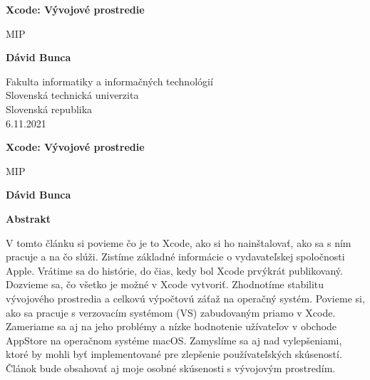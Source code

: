 \documentclass[12pt]{article}
\begin{document}
	\begin{titlepage}
   		 \begin{center}
        
            
      			  \Huge
      			  \textbf{Xcode: Vývojové prostredie}
            
     			   \vspace{0.5cm}
        			  \LARGE
				MIP
        
            
       			 \vspace{1.5cm}
            
       			 \textbf{Dávid Bunca}
            
       			 \vfill
            
            
       			 \vspace{0.8cm}

        			\centering   
            
       			 \Large
       			 Fakulta informatiky a informačných technológií\\
        			Slovenská technická univerzita\\
       			Slovenská republika\\
        			6.11.2021
            
   		 \end{center}
	\end{titlepage}

	\begin{center}
   		 \Large
    		\textbf{Xcode: Vývojové prostredie}
        
   		 \vspace{0.4cm}
    		\large
    		MIP
        
   		 \vspace{0.4cm}
    		\textbf{Dávid Bunca}
       
  		  \vspace{0.9cm}
    		\textbf{Abstrakt}
	\end{center}

			V tomto článku si povieme čo je to Xcode, ako si ho nainštalovať, ako sa s ním pracuje a na čo slúži. Zistíme základné informácie o vydavateľskej spoločnosti Apple.  Vrátime sa do histórie, do čias, kedy bol Xcode prvýkrát publikovaný.  Dozvieme sa, čo všetko je možné v Xcode vytvoriť.  Zhodnotíme stabilitu vývojového prostredia a celkovú výpočtovú záťaž na operačný systém.  Povieme si, ako sa pracuje s verzovacím systémom (VS) zabudovaným priamo v Xcode.  Zameriame sa aj na jeho problémy a nízke hodnotenie užívateľov v obchode AppStore na operačnom systéme macOS.  Zamyslíme sa aj nad vylepšeniami,  ktoré by mohli byť implementované pre zlepšenie používateľských skúseností.
Článok bude obsahovať aj moje osobné skúsenosti s vývojovým prostredím.
\end{document}
